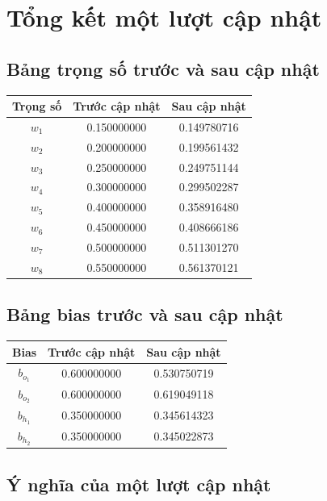 \documentclass[12pt,a4paper]{report}
\begin{document}
\chapter{Tổng kết một lượt cập nhật}

\section{Bảng trọng số trước và sau cập nhật}

\begin{center}
\begin{tabular}{ccc}
\toprule
Trọng số & Trước cập nhật & Sau cập nhật \\
\midrule
$w_1$ & 0.150000000 & 0.149780716 \\
$w_2$ & 0.200000000 & 0.199561432 \\
$w_3$ & 0.250000000 & 0.249751144 \\
$w_4$ & 0.300000000 & 0.299502287 \\
$w_5$ & 0.400000000 & 0.358916480 \\
$w_6$ & 0.450000000 & 0.408666186 \\
$w_7$ & 0.500000000 & 0.511301270 \\
$w_8$ & 0.550000000 & 0.561370121 \\
\bottomrule
\end{tabular}
\end{center}

\section{Bảng bias trước và sau cập nhật}

\begin{center}
\begin{tabular}{ccc}
\toprule
Bias & Trước cập nhật & Sau cập nhật \\
\midrule
$b_{o_1}$ & 0.600000000 & 0.530750719 \\
$b_{o_2}$ & 0.600000000 & 0.619049118 \\
$b_{h_1}$ & 0.350000000 & 0.345614323 \\
$b_{h_2}$ & 0.350000000 & 0.345022873 \\
\bottomrule
\end{tabular}
\end{center}

\section{Ý nghĩa của một lượt cập nhật}
\end{document}
